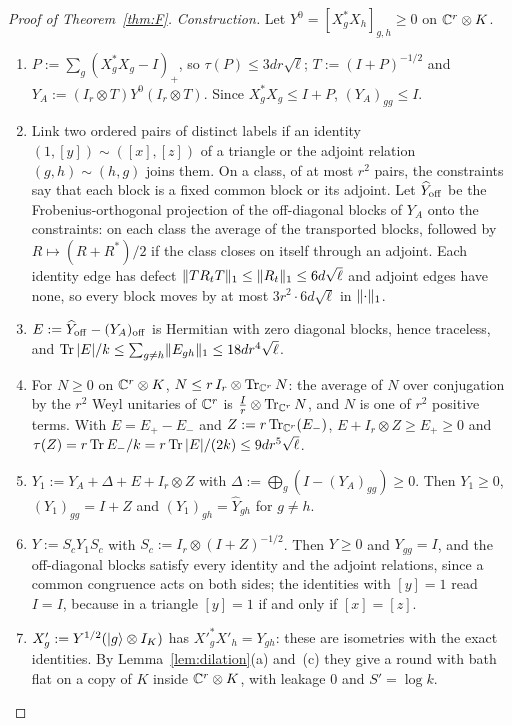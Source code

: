 \begin{proof}[Proof of Theorem~\ref{thm:F}]
\emph{Construction.} Let $Y^0=[X_g^*X_h]_{g,h}\ge0$ on $\mathbb C^r\otimes K$.
\begin{enumerate}[label=\arabic*.,itemsep=1pt]
\item $P:=\sum_g(X_g^*X_g-I)_+$, so $\tau(P)\le3dr\sqrt\ell$; $T:=(I+P)^{-1/2}$ and $Y_A:=(I_r\otimes T)Y^0(I_r\otimes T)$. Since $X_g^*X_g\le I+P$, $(Y_A)_{gg}\le I$.
\item Link two ordered pairs of distinct labels if an identity $(1,[y])\sim([x],[z])$ of a triangle or the adjoint relation $(g,h)\sim(h,g)$ joins them. On a class,
of at most $r^2$ pairs, the constraints say that each block is a fixed common block or its adjoint. Let $\widehat Y_{\rm off}$ be the Frobenius-orthogonal projection of the
off-diagonal blocks of $Y_A$ onto the constraints: on each class the average of the transported blocks, followed by $R\mapsto(R+R^*)/2$ if the class closes on
itself through an adjoint. Each identity edge has defect $\lVert TR_tT\rVert_1\le\lVert R_t\rVert_1\le6d\sqrt\ell$ and adjoint edges have none, so every block moves by at most
$3r^2\cdot6d\sqrt\ell$ in $\lVert \cdot\rVert_1$.
\item $E:=\widehat Y_{\rm off}-(Y_A)_{\rm off}$ is Hermitian with zero diagonal blocks, hence traceless, and $\operatorname{Tr}|E|/k\le\sum_{g\ne h}\lVert E_{gh}\rVert_1\le18dr^4\sqrt\ell$.
\item For $N\ge0$ on $\mathbb C^r\otimes K$, $N\le r\,I_r\otimes\operatorname{Tr}_{\mathbb C^r}N$: the average of $N$ over conjugation by the $r^2$ Weyl unitaries of $\mathbb C^r$ is $\frac Ir\otimes\operatorname{Tr}_{\mathbb C^r}N$,
and $N$ is one of $r^2$ positive terms. With $E=E_+-E_-$ and $Z:=r\operatorname{Tr}_{\mathbb C^r}(E_-)$, $E+I_r\otimes Z\ge E_+\ge0$ and $\tau(Z)=r\operatorname{Tr} E_-/k=r\operatorname{Tr}|E|/(2k)\le9dr^5\sqrt\ell$.
\item $Y_1:=Y_A+\Delta+E+I_r\otimes Z$ with $\Delta:=\bigoplus_g(I-(Y_A)_{gg})\ge0$. Then $Y_1\ge0$, $(Y_1)_{gg}=I+Z$ and $(Y_1)_{gh}=\widehat Y_{gh}$ for $g\ne h$.
\item $Y:=S_cY_1S_c$ with $S_c:=I_r\otimes(I+Z)^{-1/2}$. Then $Y\ge0$ and $Y_{gg}=I$, and the off-diagonal blocks satisfy every identity and the adjoint relations,
since a common congruence acts on both sides; the identities with $[y]=1$ read $I=I$, because in a triangle $[y]=1$ if and only if $[x]=[z]$.
\item $X'_g:=Y^{1/2}(\lvert g\rangle\otimes I_K)$ has $X'^*_gX'_h=Y_{gh}$: these are isometries with the exact identities. By Lemma~\ref{lem:dilation}(a) and~(c) they give a round with
bath flat on a copy of $K$ inside $\mathbb C^r\otimes K$, with leakage $0$ and $S'=\log k$.
\end{enumerate}


\end{proof}
